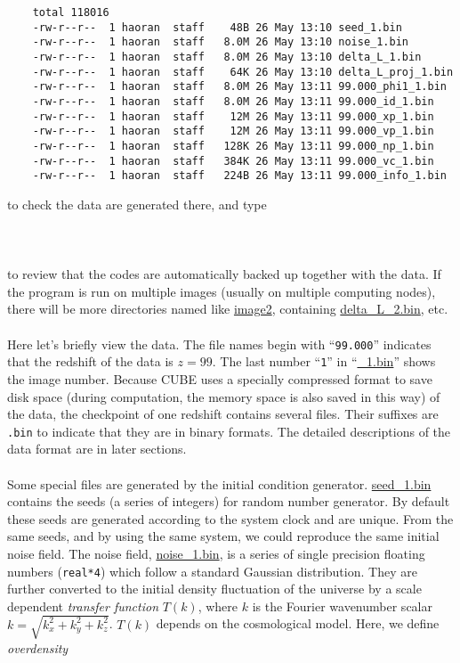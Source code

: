 \documentclass[12pt]{article}
\begin{document}
\begin{verbatim}
    total 118016
    -rw-r--r--  1 haoran  staff    48B 26 May 13:10 seed_1.bin
    -rw-r--r--  1 haoran  staff   8.0M 26 May 13:10 noise_1.bin
    -rw-r--r--  1 haoran  staff   8.0M 26 May 13:10 delta_L_1.bin
    -rw-r--r--  1 haoran  staff    64K 26 May 13:10 delta_L_proj_1.bin
    -rw-r--r--  1 haoran  staff   8.0M 26 May 13:11 99.000_phi1_1.bin
    -rw-r--r--  1 haoran  staff   8.0M 26 May 13:11 99.000_id_1.bin
    -rw-r--r--  1 haoran  staff    12M 26 May 13:11 99.000_xp_1.bin
    -rw-r--r--  1 haoran  staff    12M 26 May 13:11 99.000_vp_1.bin
    -rw-r--r--  1 haoran  staff   128K 26 May 13:11 99.000_np_1.bin
    -rw-r--r--  1 haoran  staff   384K 26 May 13:11 99.000_vc_1.bin
    -rw-r--r--  1 haoran  staff   224B 26 May 13:11 99.000_info_1.bin
\end{verbatim}
to check the data are generated there, and type
\\\\
\\\\
to review that the codes are automatically backed up together with the data. If the program is run on multiple images (usually on multiple computing nodes), there will be more directories named like \url{image2}, containing \url{delta_L_2.bin}, etc.
\\\\
Here let's briefly view the data. The file names begin with ``{\tt 99.000}'' indicates that the redshift of the data is $z=99$. The last number ``{\tt 1}'' in ``\url{_1.bin}'' shows the image number. Because CUBE uses a specially compressed format to save disk space (during computation, the memory space is also saved in this way) of the data, the checkpoint of one redshift contains several files. Their suffixes are {\tt *.bin} to indicate that they are in binary formats. The detailed descriptions of the data format are in later sections.
\\\\
Some special files are generated by the initial condition generator. \url{seed_1.bin} contains the seeds (a series of integers) for random number generator. By default these seeds are generated according to the system clock and are unique. From the same seeds, and by using the same system, we could reproduce the same initial noise field. The noise field, \url{noise_1.bin}, is a series of single precision floating numbers ({\tt real*4}) which follow a standard Gaussian distribution. 
They are further converted to the initial density fluctuation of the universe by a scale dependent {\it transfer function} $T(k)$, where $k$ is the Fourier wavenumber scalar $k=\sqrt{k_x^2+k_y^2+k_z^2}$. $T(k)$ depends on the cosmological model. Here, we define {\it overdensity}
\end{document}
